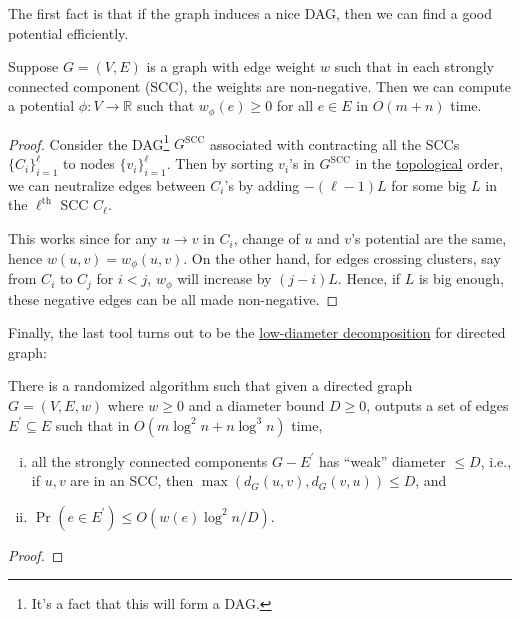 The first fact is that if the graph induces a nice DAG, then we can find a good potential efficiently.

\begin{lemma}\label{lma:SSSP-fix-DAG}
	Suppose \(G = (V, E)\) is a graph with edge weight \(w\) such that in each strongly connected component (SCC), the weights are non-negative. Then we can compute a potential \(\phi \colon V \to \mathbb{R} \) such that \(w_{\phi } (e) \geq 0\) for all \(e \in E\) in \(O(m + n)\) time.
\end{lemma}
\begin{proof}
	Consider the DAG\footnote{It's a fact that this will form a DAG.} \(G^{\text{SCC} }\) associated with contracting all the SCCs \(\{ C_i \} _{i=1}^{\ell }\) to nodes \(\{ v_i \} _{i=1}^{\ell }\). Then by sorting \(v_i\)'s in \(G^{\text{SCC} }\) in the \href{https://en.wikipedia.org/wiki/Topological_sorting}{topological} order, we can neutralize edges between \(C_i\)'s by adding \(- (\ell - 1) L\) for some big \(L\) in the \(\ell ^{\text{th} }\) SCC \(C_{\ell } \).
	\begin{center}
	\end{center}
	This works since for any \(u \to v\) in \(C_i\), change of \(u\) and \(v\)'s potential are the same, hence \(w (u, v)= w_{\phi }(u, v) \). On the other hand, for edges crossing clusters, say from \(C_i\) to \(C_j\) for \(i < j\), \(w_{\phi } \) will increase by \((j-i) L\). Hence, if \(L\) is big enough, these negative edges can be all made non-negative.
\end{proof}

Finally, the last tool turns out to be the \hyperref[def:low-diameter-decomposition]{low-diameter decomposition} for directed graph:

\begin{theorem}\label{thm:directed-LDD}
	There is a randomized algorithm such that given a directed graph \(G = (V, E, w)\) where \(w \geq 0\) and a diameter bound \(D \geq 0\), outputs a set of edges \(E^{\prime} \subseteq E\) such that in \(O(m \log ^2 n + n \log ^3 n)\) time,
	\begin{enumerate}[(i)]
		\item all the strongly connected components \(G - E^{\prime} \) has ``weak'' diameter \(\leq D\), i.e., if \(u, v\) are in an SCC, then \(\max (d_G(u, v), d_G(v, u)) \leq D\), and
		\item \(\Pr_{}(e \in E^{\prime} ) \leq O(w(e) \log ^2 n / D)\).
	\end{enumerate}
\end{theorem}
\begin{proof}
\end{proof}

